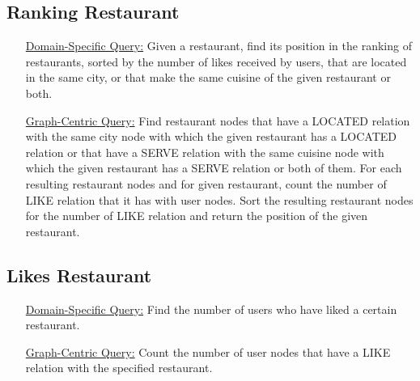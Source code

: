 \subsection{Ranking Restaurant}
\begin{itemize}
    \item [\underline{Domain-Specific Query:}] Given a restaurant, find its
	    position in the ranking of restaurants, sorted by the number of
	    likes received by users, that are located in the same city, or that
	    make the same cuisine of the given restaurant or both.
    \item [\underline{Graph-Centric Query:}] Find restaurant nodes that have a
	    LOCATED relation with the same city node with which the given
	    restaurant has a LOCATED relation or that have a SERVE relation with
	    the same cuisine node with which the given restaurant has a SERVE
	    relation or both of them. For each resulting restaurant nodes and
	    for given restaurant, count the number of LIKE relation that it has
	    with user nodes. Sort the resulting restaurant nodes for the number
	    of LIKE relation and return the position of the given restaurant.
\end{itemize}
    
\subsection{Likes Restaurant}
\begin{itemize}
    \item [\underline{Domain-Specific Query:}] Find the number of users who have
	    liked a certain restaurant.
    \item [\underline{Graph-Centric Query:}] Count the number of user nodes that
	    have a LIKE relation with the specified restaurant.
\end{itemize}


























